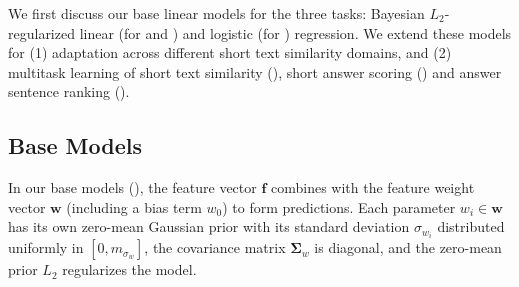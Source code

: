 We first discuss our base linear models for the three tasks: Bayesian
$L_2$-regularized linear (for \sts{} and \sas{}) and logistic
(for \asr{}) regression.  We extend these models for (1)
adaptation across different short text similarity domains, and (2)
multitask learning of short text similarity (\sts{}), short answer scoring
(\sas{}) and answer sentence ranking (\asr{}).


\subsection{Base Models}
\label{section:approach-base-models}


In our base models (), the feature vector
$\boldsymbol{f}$ combines with the feature weight vector
$\boldsymbol{w}$ (including a bias term $w_0$) to form predictions.
Each parameter $w_i \in \boldsymbol{w}$ has its own zero-mean Gaussian
prior with its standard deviation $\sigma_{w_i}$ distributed uniformly
in $[0, m_{\sigma_w}]$, the covariance matrix $\boldsymbol{\Sigma}_w$
is diagonal, and the zero-mean prior $L_2$ regularizes the model.

